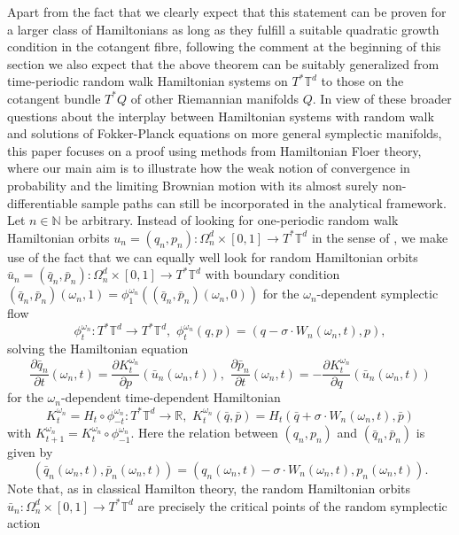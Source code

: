 \documentclass[a4paper,11pt]{amsart}
\newcommand{\NN}{\mathbb{N}}
\newcommand{\RR}{\mathbb{R}}
\newcommand{\TT}{\mathbb{T}}
\begin{document}
Apart from the fact that we clearly expect that this statement can be proven for a larger class of Hamiltonians as long as they fulfill a suitable quadratic growth condition in the cotangent fibre, following the comment at the beginning of this section we also expect that the above theorem can be suitably generalized from time-periodic random walk Hamiltonian systems on $T^*\TT^d$ to those on the cotangent bundle $T^*Q$ of other Riemannian manifolds $Q$. In view of these broader questions about the interplay between Hamiltonian systems with random walk and solutions of Fokker-Planck equations on more general symplectic manifolds, this paper focuses on a proof using methods from Hamiltonian Floer theory, where our main aim is to illustrate how the weak notion of convergence in probability and the limiting Brownian motion with its almost surely non-differentiable sample paths can still be incorporated in the analytical framework. \\
\indent Let $n\in\NN$ be arbitrary. Instead of looking for one-periodic random walk Hamiltonian orbits $u_n=(q_n,p_n):\Omega_n^d\times [0,1]\to T^*\TT^d$ in the sense of , we make use of the fact that we can equally well look for random Hamiltonian orbits  $\bar{u}_n=(\bar{q}_n,\bar{p}_n):\Omega_n^d\times [0,1]\to T^*\TT^d$ with boundary condition $(\bar{q}_n,\bar{p}_n)(\omega_n,1)=\phi^{\omega_n}_1( (\bar{q}_n,\bar{p}_n)(\omega_n,0))$ for the $\omega_n$-dependent symplectic flow \[\phi^{\omega_n}_t: T^*\TT^d\to T^*\TT^d,\,\,\phi^{\omega_n}_t(q,p)=(q-\sigma\cdot W_n(\omega_n,t),p),\] solving the Hamiltonian equation 
\begin{equation}\label{G-eq} \frac{\partial\bar{q}_n}{\partial t}(\omega_n,t)=\frac{\partial K^{\omega_n}_t}{\partial p}(\bar{u}_n(\omega_n,t)),\,\,\frac{\partial\bar{p}_n}{\partial t}(\omega_n,t)=-\frac{\partial K^{\omega_n}_t}{\partial q}(\bar{u}_n(\omega_n,t))\end{equation} for the $\omega_n$-dependent time-dependent Hamiltonian \[K^{\omega_n}_t=H_t\circ\phi^{\omega_n}_{-t}:T^*\TT^d\to\RR,\,\, K^{\omega_n}_t(\bar{q},\bar{p})=H_t(\bar{q}+\sigma\cdot W_n(\omega_n,t),\bar{p})\] with $K^{\omega_n}_{t+1}=K^{\omega_n}_t\circ\phi^{\omega_n}_{-1}$. Here the relation between $(q_n,p_n)$ and $(\bar{q}_n,\bar{p}_n)$ is given by \[(\bar{q}_n(\omega_n,t),\bar{p}_n(\omega_n,t))=(q_n(\omega_n,t)-\sigma\cdot W_n(\omega_n,t),p_n(\omega_n,t)).\] Note that, as in classical Hamilton theory, the random Hamiltonian orbits $\bar{u}_n:\Omega_n^d\times [0,1]\to T^*\TT^d$ are precisely the critical points of the random symplectic action 
\end{document}

